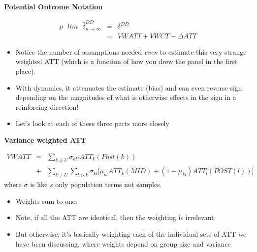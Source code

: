 \documentclass[notes=show]{beamer}
\begin{document}
\begin{frame}[plain]
\begin{center}
\textbf{Potential Outcome Notation}
\end{center}

\begin{eqnarray*}
p\text{ }lim\text{ } \widehat{\delta}^{DD}_{n\to\infty} &=& \delta^{DD} \\
&=& VWATT + VWCT - \Delta ATT
\end{eqnarray*}

\begin{itemize}
\item Notice the number of assumptions needed \emph{even} to estimate this very strange weighted ATT (which is a function of how you drew the panel in the first place). 
\item With dynamics, it attenuates the estimate (bias) and can even reverse sign depending on the magnitudes of what is otherwise effects in the sign in a reinforcing direction! 
\item Let's look at each of these three parts more closely
\end{itemize}

\end{frame}


\begin{frame}[plain]
\begin{center}
\textbf{Variance weighted ATT}
\end{center}

\begin{eqnarray*}
VWATT &=& \sum_{k \neq U} \sigma_{kU} ATT_k(Post(k))\\
&+& \sum_{k \neq U} \sum_{l>k} \sigma_{kl} \bigg [ \mu_{kl} ATT_k (MID)+ (1-\mu_{kl}) ATT_{l} (POST(l)) \bigg ]
\end{eqnarray*}where $\sigma$ is like $s$ only population terms not samples.  
\begin{itemize}
\item Weights sum to one. 
\item Note, if all the ATT are identical, then the weighting is irrelevant. 
\item But otherwise, it's basically weighting each of the individual sets of ATT we have been discussing, where weights depend on group size and variance
\end{itemize}

\end{frame}
\end{document}
